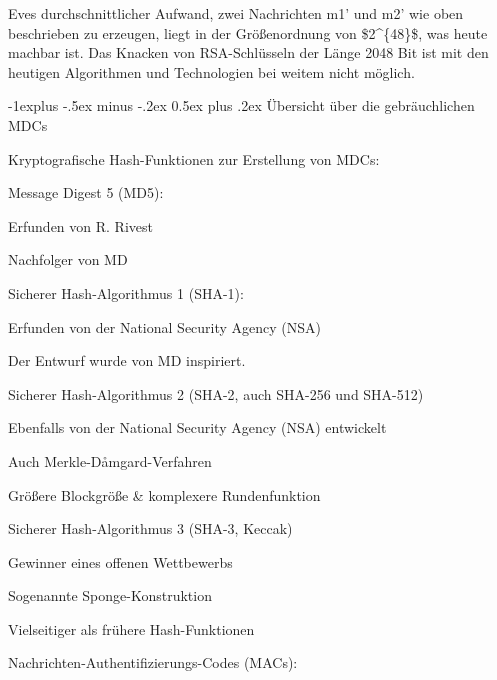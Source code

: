 \documentclass[a4paper]{article}
\makeatletter
\renewcommand{\subsection}{\@startsection{subsection}{2}{0mm}%
 {-1explus -.5ex minus -.2ex}%
 {0.5ex plus .2ex}%
 {\normalfont\normalsize\bfseries}}
\makeatother
\begin{document}
\begin{multicols}{3}
\begin{itemize*}
            \begin{itemize*}
                  \item Eves durchschnittlicher Aufwand, zwei Nachrichten m1' und m2' wie oben beschrieben zu erzeugen, liegt in der Größenordnung von \$2\^{}\{48\}\$, was heute machbar ist. Das Knacken von RSA-Schlüsseln der Länge 2048 Bit ist mit den heutigen Algorithmen und Technologien bei weitem nicht möglich.
            \end{itemize*}
      \end{itemize*}


      \subsection{Übersicht über die gebräuchlichen
            MDCs}

      \begin{itemize*}
            \item
            Kryptografische Hash-Funktionen zur Erstellung von MDCs:

            \begin{itemize*}
                  \item Message Digest 5 (MD5):
                  \begin{itemize*} \item Erfunden von R. Rivest \item Nachfolger von MD \end{itemize*}
                  \item Sicherer Hash-Algorithmus 1 (SHA-1):
                  \begin{itemize*} \item Erfunden von der National Security Agency (NSA) \item Der Entwurf wurde von MD inspiriert. \end{itemize*}
                  \item Sicherer Hash-Algorithmus 2 (SHA-2, auch SHA-256 und SHA-512)
                  \begin{itemize*} \item Ebenfalls von der National Security Agency (NSA) entwickelt \item Auch Merkle-Dåmgard-Verfahren \item Größere Blockgröße \& komplexere Rundenfunktion \end{itemize*}
                  \item Sicherer Hash-Algorithmus 3 (SHA-3, Keccak)
                  \begin{itemize*} \item Gewinner eines offenen Wettbewerbs \item Sogenannte Sponge-Konstruktion \item Vielseitiger als frühere Hash-Funktionen \end{itemize*}
            \end{itemize*}
            \item
            Nachrichten-Authentifizierungs-Codes (MACs):


\end{itemize*}
\end{multicols}
\end{document}
